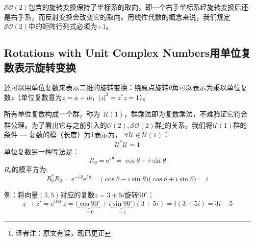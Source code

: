 $\mathcal{SO}(2)$包含的旋转变换保持了坐标系的取向，即一个右手坐标系经旋转变换后还是右手系，而反射变换会改变它的取向。用线性代数的概念来说，我们规定$\mathcal{SO}(2)$中的矩阵行列式必须为$+1$。

\subsection[用单位复数表示旋转变换]{Rotations with Unit Complex Numbers\quad 用单位复数表示旋转变换}
\label{sec3.2.1}
还可以用单位复数来表示二维的旋转变换：绕原点旋转$\theta$角可以表示为乘以单位复数$z$（单位复数意为$z = a + ib$，$|z|^2 = z^* z = 1$）。

所有单位复数构成一个群，称为\ $\mathcal{U}(1)$，群乘法即为复数乘法，不难验证它符合群公理。为了看出它与之前引入的$\mathcal{O}(2), \mathcal{SO}(2)$群\footnote{译者注：原文有误，现已更正}的关系，我们将$\mathcal{U}(1)$群的条件 --- 复数的模（长度）为1表示为， $\forall \mathcal{U} \in \mathcal{U}(1)$：
\begin{equation}
\label{equ3.11}
\mathcal{U}^* \mathcal{U} = 1
\end{equation}
单位复数另一种写法是：%
\begin{equation}
\label{equ3.12}
R_\theta = \mathrm{e}^{i\,\theta} = \cos \theta + i\sin \theta
\end{equation}
$R_\theta$的模平方为:
\begin{equation}
\label{equ3.13}
R_\theta^* R_\theta = \mathrm{e}^{-i\,\theta} \mathrm{e}^{i\,\theta} = \big( \cos \theta - i \sin \theta  \big) \big( \cos \theta + i \sin \theta \big) = 1
\end{equation}

\label{fig3.5}

例：将向量$(3,  5)$对应的复数$z = 3 + 5i$旋转$90^\circ$：
\begin{equation}
\label{equ3.14}
z \rightarrow z' = \mathrm{e}^{i\, 90^\circ}z = \bigg( \underbrace{\cos 90^\circ}_{=0} + i\underbrace{\sin 90^\circ}_{=1} \bigg) (3 + 5i) = i(3 + 5i) = 3i - 5
\end{equation}

